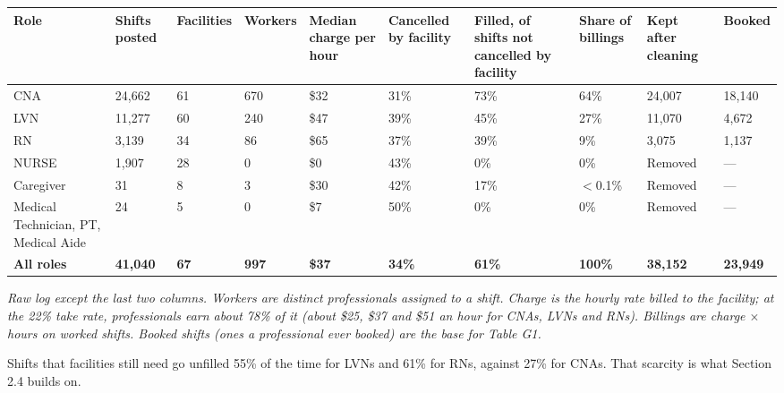 \documentclass[11pt]{article}
\newcommand{\lthan}{\ensuremath{<}}
\begin{document}
\begin{center}\small\setlength{\tabcolsep}{4pt}
\begin{tabularx}{\textwidth}{@{}LR{1.2cm}R{1.4cm}R{1.1cm}R{1.4cm}R{1.4cm}R{1.8cm}R{1.2cm}R{1.4cm}R{1.1cm}@{}}
\toprule
Role & Shifts posted & Facilities & Workers & Median charge per hour & Cancelled by facility & Filled, of shifts not
cancelled by facility & Share of billings & Kept after cleaning & Booked \\
\midrule
CNA & 24,662 & 61 & 670 & \$32 & 31\% & 73\% & 64\% & 24,007 & 18,140 \\
LVN & 11,277 & 60 & 240 & \$47 & 39\% & 45\% & 27\% & 11,070 & 4,672 \\
RN & 3,139 & 34 & 86 & \$65 & 37\% & 39\% & 9\% & 3,075 & 1,137 \\
NURSE & 1,907 & 28 & 0 & \$0 & 43\% & 0\% & 0\% & Removed & --- \\
Caregiver & 31 & 8 & 3 & \$30 & 42\% & 17\% & \lthan{}0.1\% & Removed & --- \\
Medical Technician, PT, Medical Aide & 24 & 5 & 0 & \$7 & 50\% & 0\% & 0\% & Removed & --- \\
\midrule
\textbf{All roles} & \textbf{41,040} & \textbf{67} & \textbf{997} & \textbf{\$37} & \textbf{34\%} & \textbf{61\%} &
\textbf{100\%} & \textbf{38,152} & \textbf{23,949} \\
\bottomrule
\end{tabularx}
\end{center}
{\small\textit{Raw log except the last two columns. Workers are distinct professionals assigned to a shift. Charge is the
hourly rate billed to the facility; at the 22\% take rate, professionals earn about 78\% of it (about \$25, \$37 and \$51
an hour for CNAs, LVNs and RNs). Billings are charge $\times$ hours on worked shifts. Booked shifts (ones a professional
ever booked) are the base for Table G1.}}

Shifts that facilities still need go unfilled 55\% of the time for LVNs and 61\% for RNs, against 27\% for CNAs. That
scarcity is what Section 2.4 builds on.
\end{document}
